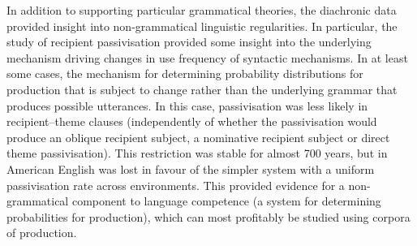 	In addition to supporting particular grammatical theories, the diachronic data provided insight into non-grammatical linguistic regularities. In particular, the study of recipient passivisation provided some insight into the underlying mechanism driving changes in use frequency of syntactic mechanisms. In at least some cases, the mechanism for determining probability distributions for production that is subject to change rather than the underlying grammar that produces possible utterances. In this case, passivisation was less likely in recipient--theme clauses (independently of whether the passivisation would produce an oblique recipient subject, a nominative recipient subject or direct theme passivisation). This restriction was stable for almost 700 years, but in American English was lost in favour of the simpler system with a uniform passivisation rate across environments. This provided evidence for a non-grammatical component to language competence (a system for determining probabilities for production), which can most profitably be studied using corpora of production.
%
